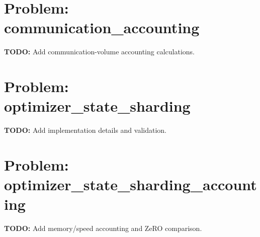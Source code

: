 \documentclass[11pt]{article}
\begin{document}
\section{Problem: communication\_accounting}
\textbf{TODO:} Add communication-volume accounting calculations.

\section{Problem: optimizer\_state\_sharding}
\textbf{TODO:} Add implementation details and validation.

\section{Problem: optimizer\_state\_sharding\_accounting}
\textbf{TODO:} Add memory/speed accounting and ZeRO comparison.
\end{document}
